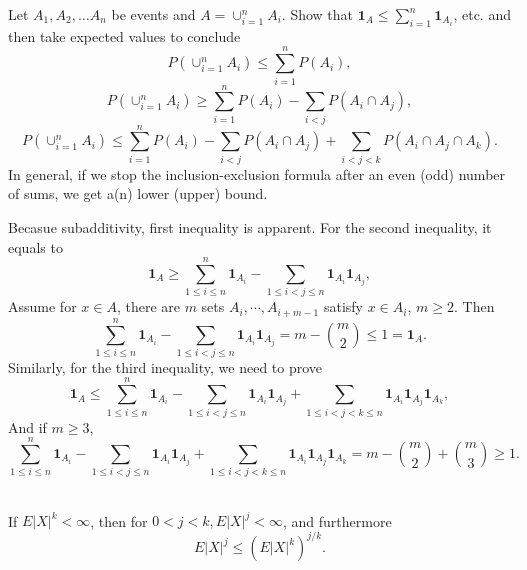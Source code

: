 \documentclass[en, normal, 11pt, black]{elegantnote}
\newenvironment{exercise}[1]{\begin{tcolorbox}[colback=black!15, colframe=black!80, breakable, title=#1]}{\end{tcolorbox}}
\renewenvironment{proof}{\begin{tcolorbox}[colback=white, colframe=black!50, breakable, title=Proof. ]\setlength{\parskip}{0.8em}}{\\\rightline{$\square$}\end{tcolorbox}}
\begin{document}
    \begin{exercise}{1.6.10. Bonferroni inequalities.}
        Let $A_{1}, A_{2}, \ldots A_{n}$ be events and $A=\cup_{i=1}^{n} A_{i} .$ Show that $\mathbf{1}_{A} \leq \sum_{i=1}^{n} \mathbf{1}_{A_{i}}$, etc. and then take expected values to conclude
        \[
            P\left(\cup_{i=1}^{n} A_{i}\right) \leq \sum_{i=1}^{n} P\left(A_{i}\right), 
        \]
        \[
            P\left(\cup_{i=1}^{n} A_{i}\right) \geq \sum_{i=1}^{n} P\left(A_{i}\right)-\sum_{i<j} P\left(A_{i} \cap A_{j}\right), 
        \]
        \[
            P\left(\cup_{i=1}^{n} A_{i}\right) \leq \sum_{i=1}^{n} P\left(A_{i}\right)-\sum_{i<j} P\left(A_{i} \cap A_{j}\right)+\sum_{i<j<k} P\left(A_{i} \cap A_{j} \cap A_{k}\right). 
        \]
        In general, if we stop the inclusion-exclusion formula after an even (odd) number of sums, we get a(n) lower (upper) bound. 
    \end{exercise}
    \begin{proof}
        Becasue subadditivity, first inequality is apparent. For the second inequality, it equals to 
        \[
            \mathbf{1}_{A} \geqslant \sum_{1\leqslant i\leqslant n}^{n} \mathbf{1}_{A_{i}}-\sum_{1\leqslant i<j\leqslant n} \mathbf{1}_{A_{i}} \mathbf{1}_{A_{j}}, 
        \]
        Assume for $x\in A$, there are $m$ sets $A_i, \cdots, A_{i+m-1}$ satisfy $x\in A_i$, $m\geqslant2$. Then
        \[
            \sum_{1\leqslant i\leqslant n}^{n} \mathbf{1}_{A_{i}}-\sum_{1\leqslant i<j\leqslant n} \mathbf{1}_{A_{i}} \mathbf{1}_{A_{j}}
            =m-\binom{m}{2} \leqslant 1=\mathbf{1}_{A}. 
        \]
        Similarly, for the third inequality, we need to prove
        \[
            \mathbf{1}_{A} \leqslant \sum_{1\leqslant i\leqslant n}^{n} \mathbf{1}_{A_{i}}-\sum_{1\leqslant i<j\leqslant n} \mathbf{1}_{A_{i}} \mathbf{1}_{A_{j}}+\sum_{1\leqslant i<j<k\leqslant n} \mathbf{1}_{A_{i}} \mathbf{1}_{A_{j}}\mathbf{1}_{A_{k}}, 
        \]
        And if $m\geqslant3$, 
        \[
            \sum_{1\leqslant i\leqslant n}^{n} \mathbf{1}_{A_{i}}-\sum_{1\leqslant i<j\leqslant n} \mathbf{1}_{A_{i}} \mathbf{1}_{A_{j}}+\sum_{1\leqslant i<j<k\leqslant n} \mathbf{1}_{A_{i}} \mathbf{1}_{A_{j}}\mathbf{1}_{A_{k}}=m-\binom{m}{2}+\binom{m}{3}\geqslant1. 
        \]
        \vspace{-30pt}
    \end{proof}


    \begin{exercise}{1.6.11.}
        If $E|X|^{k}<\infty$, then for $0<j<k, E|X|^{j}<\infty$, and furthermore 
        \[
            E|X|^{j} \leq\left(E|X|^{k}\right)^{j / k}. 
        \]
    \end{exercise}
\end{document}
